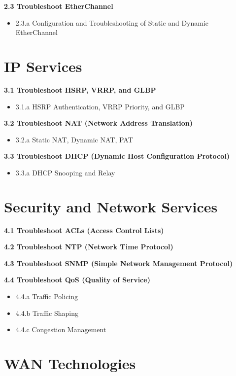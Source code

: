 \documentclass{article}
\begin{document}
\noindent\textbf{2.3 Troubleshoot EtherChannel}
\begin{itemize}
    \item 2.3.a Configuration and Troubleshooting of Static and Dynamic EtherChannel
\end{itemize}

\section{IP Services}

\noindent\textbf{3.1 Troubleshoot HSRP, VRRP, and GLBP}
\begin{itemize}
    \item 3.1.a HSRP Authentication, VRRP Priority, and GLBP
\end{itemize}

\noindent\textbf{3.2 Troubleshoot NAT (Network Address Translation)}
\begin{itemize}
    \item 3.2.a Static NAT, Dynamic NAT, PAT
\end{itemize}

\noindent\textbf{3.3 Troubleshoot DHCP (Dynamic Host Configuration Protocol)}
\begin{itemize}
    \item 3.3.a DHCP Snooping and Relay
\end{itemize}

\section{Security and Network Services}

\noindent\textbf{4.1 Troubleshoot ACLs (Access Control Lists)}

\noindent\textbf{4.2 Troubleshoot NTP (Network Time Protocol)}

\noindent\textbf{4.3 Troubleshoot SNMP (Simple Network Management Protocol)}

\noindent\textbf{4.4 Troubleshoot QoS (Quality of Service)}
\begin{itemize}
    \item 4.4.a Traffic Policing
    \item 4.4.b Traffic Shaping
    \item 4.4.c Congestion Management
\end{itemize}

\section{WAN Technologies}
\end{document}
